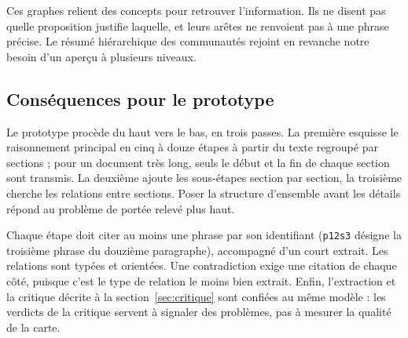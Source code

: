 Ces graphes relient des concepts pour retrouver l’information. Ils ne disent pas quelle proposition justifie laquelle, et leurs arêtes ne renvoient pas à une phrase précise. Le résumé hiérarchique des communautés rejoint en revanche notre besoin d’un aperçu à plusieurs niveaux.

\subsection{Conséquences pour le prototype}

Le prototype procède du haut vers le bas, en trois passes. La première esquisse le raisonnement principal en cinq à douze étapes à partir du texte regroupé par sections ; pour un document très long, seuls le début et la fin de chaque section sont transmis. La deuxième ajoute les sous-étapes section par section, la troisième cherche les relations entre sections. Poser la structure d’ensemble avant les détails répond au problème de portée relevé plus haut.

Chaque étape doit citer au moins une phrase par son identifiant (\texttt{p12s3} désigne la troisième phrase du douzième paragraphe), accompagné d’un court extrait. Les relations sont typées et orientées. Une contradiction exige une citation de chaque côté, puisque c’est le type de relation le moins bien extrait. Enfin, l’extraction et la critique décrite à la section~\ref{sec:critique} sont confiées au même modèle : les verdicts de la critique servent à signaler des problèmes, pas à mesurer la qualité de la carte.

